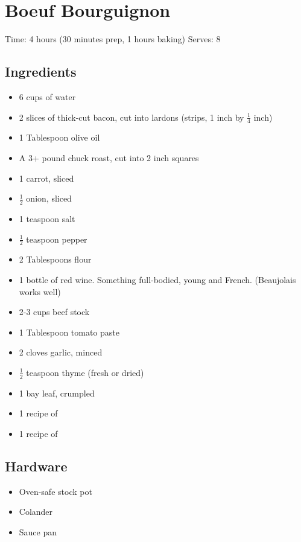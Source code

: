 \section{Boeuf Bourguignon}
\label{boeufBourguignon}
\setcounter{secnumdepth}{0}
Time: 4 hours (30 minutes prep, 1 hours baking)
Serves: 8

\begin{multicols}{2}
\subsection*{Ingredients}
\begin{itemize}
    \item 6 cups of water
    \item 2 slices of thick-cut bacon, cut into lardons (strips, 1 inch by \( \frac{1}{4} \) inch)
    \item 1 Tablespoon olive oil
    \item A 3+ pound chuck roast, cut into 2 inch squares
    \item 1 carrot, sliced
    \item \( \frac{1}{2} \) onion, sliced
    \item 1 teaspoon salt
    \item \( \frac{1}{2} \) teaspoon pepper
    \item 2 Tablespoons flour
    \item 1 bottle of red wine. Something full-bodied, young and French. (Beaujolais works well)
    \item 2-3 cups beef stock
    \item 1 Tablespoon tomato paste
    \item 2 cloves garlic, minced
    \item \( \frac{1}{2} \) teaspoon thyme (fresh or dried)
    \item 1 bay leaf, crumpled
    \item 1 recipe of 
    \item 1 recipe of 
\end{itemize}

\subsection*{Hardware}
\begin{itemize}
    \item Oven-safe stock pot
    \item Colander
    \item Sauce pan
\end{itemize}
\clearpage


\end{multicols}
